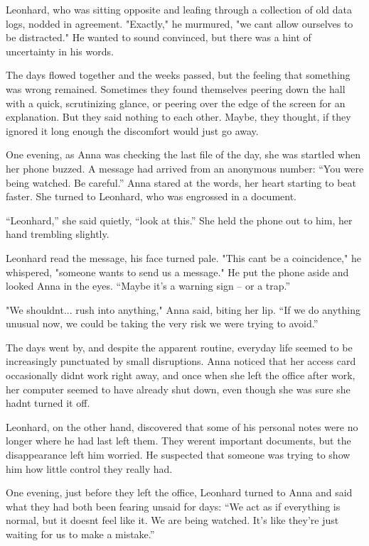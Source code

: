 \documentclass[
]{article}
\begin{document}
Leonhard, who was sitting opposite and leafing through a collection of
old data logs, nodded in agreement. "Exactly," he murmured, "we
can\textquotesingle t allow ourselves to be distracted." He wanted to
sound convinced, but there was a hint of uncertainty in his words.

The days flowed together and the weeks passed, but the feeling that
something was wrong remained. Sometimes they found themselves peering
down the hall with a quick, scrutinizing glance, or peering over the
edge of the screen for an explanation. But they said nothing to each
other. Maybe, they thought, if they ignored it long enough the
discomfort would just go away.

One evening, as Anna was checking the last file of the day, she was
startled when her phone buzzed. A message had arrived from an anonymous
number: ``You were being watched. Be careful.'' Anna stared at the
words, her heart starting to beat faster. She turned to Leonhard, who
was engrossed in a document.

``Leonhard,'' she said quietly, ``look at this.'' She held the phone out
to him, her hand trembling slightly.

Leonhard read the message, his face turned pale. "This
can\textquotesingle t be a coincidence," he whispered, "someone wants to
send us a message." He put the phone aside and looked Anna in the eyes.
``Maybe it's a warning sign -- or a trap.''

"We shouldn\textquotesingle t... rush into anything," Anna said, biting
her lip. ``If we do anything unusual now, we could be taking the very
risk we were trying to avoid.''

The days went by, and despite the apparent routine, everyday life seemed
to be increasingly punctuated by small disruptions. Anna noticed that
her access card occasionally didn\textquotesingle t work right away, and
once when she left the office after work, her computer seemed to have
already shut down, even though she was sure she hadn\textquotesingle t
turned it off.

Leonhard, on the other hand, discovered that some of his personal notes
were no longer where he had last left them. They weren\textquotesingle t
important documents, but the disappearance left him worried. He
suspected that someone was trying to show him how little control they
really had.

One evening, just before they left the office, Leonhard turned to Anna
and said what they had both been fearing unsaid for days: ``We act as if
everything is normal, but it doesn\textquotesingle t feel like it. We
are being watched. It's like they're just waiting for us to make a
mistake.''
\end{document}
